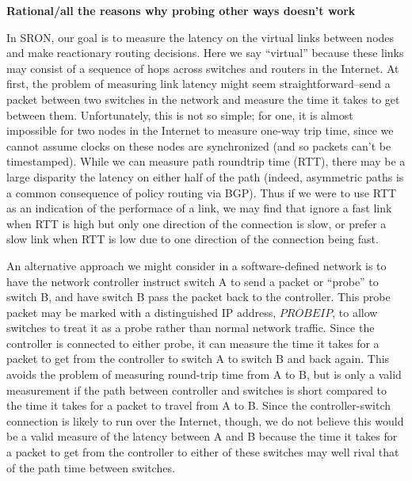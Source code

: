 \documentclass[pageno]{jpaper}
\begin{document}
{\bf Rational/all the reasons why probing other ways doesn't work}\bigskip

In SRON, our goal is to measure the latency on the virtual links between nodes and make reactionary
routing decisions. Here we say ``virtual'' because these links may consist of a sequence of hops
across switches and routers in the Internet. At first, the problem of measuring link latency 
might seem straightforward--send a packet between two switches in the network and measure the time
it takes to get between them. Unfortunately, this is not so simple; for one, it is almost impossible
for two nodes in the Internet to measure one-way trip time, since we cannot assume clocks on these
nodes are synchronized (and so packets can't be timestamped). While we can measure path roundtrip 
time (RTT), there may be a large disparity the latency on either half of the path (indeed, asymmetric
paths is a common consequence of policy routing via BGP). Thus if we were to use RTT as an indication 
of the performace of a link, we may find that ignore a fast link when RTT is high but only one direction
of the connection is slow, or prefer a slow link when RTT is low due to one direction of the connection
being fast. 

An alternative approach we might consider in a software-defined network is to have the network controller 
instruct switch A to send a packet or ``probe'' to switch B, and have switch B pass the packet back 
to the controller. This probe packet may be marked with a distinguished IP address, $PROBEIP$, to allow
switches to treat it as a probe rather than normal network traffic. 
Since the controller is connected to either probe, it can measure the time it takes 
for a packet to get from the controller to switch A to switch B and back again.  This avoids the problem 
of measuring round-trip time from A to B, but is only a valid measurement if the path between controller 
and switches is short compared to the time it takes for a packet to travel from A to B. Since the 
controller-switch connection is likely to run over the Internet, though, we do not believe this would be 
a valid measure of the latency between A and B because the time it takes for a packet to get from the controller
to either of these switches may well rival that of the path time between switches.
\end{document}
